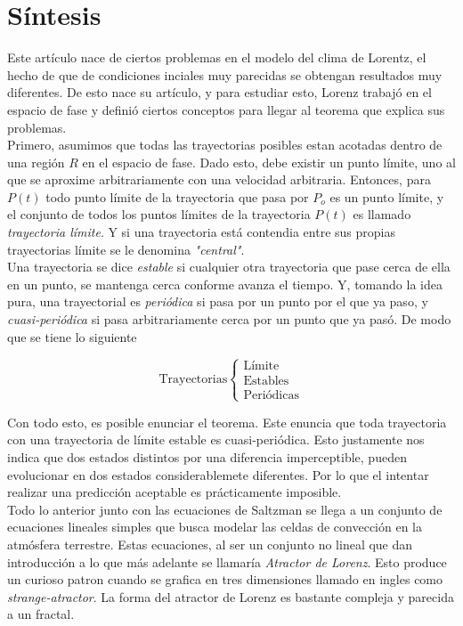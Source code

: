 \vspace{0.5cm}


\section*{Síntesis}

Este artículo nace de ciertos problemas en el modelo del clima de Lorentz, el hecho de que de condiciones inciales muy parecidas se obtengan resultados muy diferentes. De esto nace su artículo, y para estudiar esto, Lorenz trabajó en el espacio de fase y definió ciertos conceptos para llegar al teorema que explica sus problemas. \\

Primero, asumimos que todas las trayectorias posibles estan acotadas dentro de una región $R$ en el espacio de fase. Dado esto, debe existir un punto límite, uno al que se aproxime arbitrariamente con una velocidad arbitraria. Entonces, para $P(t)$ todo punto límite de la trayectoria que pasa por $P_o$ es un punto límite, y el conjunto de todos los puntos límites de la trayectoria $P(t)$ es llamado \textit{trayectoria límite}. Y si una trayectoria está contendia entre sus propias trayectorias límite se le denomina \textit{"central"}. \\

Una trayectoria se dice \textit{estable} si cualquier otra trayectoria que pase cerca de ella en un punto, se mantenga cerca conforme avanza el tiempo. Y, tomando la idea pura, una trayectorial es \textit{periódica} si pasa por un punto por el que ya paso, y \textit{cuasi-periódica} si pasa arbitrariamente cerca por un punto que ya pasó. De modo que se tiene lo siguiente

$$  
	\text{Trayectorias} \left\{\begin{array}{c}
		\text{Límite} \\
		\text{Estables} \\
		\text{Periódicas}
	\end{array}\right.
$$

Con todo esto, es posible enunciar el teorema. Este enuncia que toda trayectoria con una trayectoria de límite estable es cuasi-periódica. Esto justamente nos indica que dos estados distintos por una diferencia imperceptible, pueden evolucionar en dos estados considerablemete diferentes. Por lo que el intentar realizar una predicción aceptable es prácticamente imposible. \\

Todo lo anterior junto con las ecuaciones de Saltzman se llega a un conjunto de ecuaciones lineales simples que busca modelar las celdas de convección en la atmósfera terrestre. Estas ecuaciones, al ser un conjunto no lineal que dan introducción a lo que más adelante se llamaría \textit{Atractor de Lorenz}. Esto produce un curioso patron cuando se grafica en tres dimensiones llamado en ingles como \textit{strange-atractor}. La forma del atractor de Lorenz es bastante compleja y parecida a un fractal. \\

